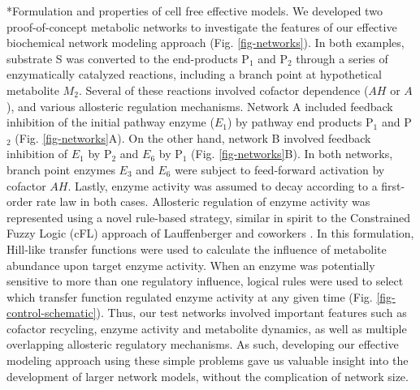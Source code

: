 \documentclass[12pt]{article}
\makeatletter
\renewcommand\subsection{\@startsection
	{subsection}{2}{0mm}
	{-0.05in}
	{-0.5\baselineskip}
	{\normalfont\normalsize\bfseries}}
\makeatother
\begin{document}
\subsection*{Formulation and properties of cell free effective models.}
We developed two proof-of-concept metabolic networks to investigate the features of our effective biochemical network modeling approach (Fig. \ref{fig-networks}).
In both examples, substrate S was converted to the end-products P$_{1}$ and P$_{2}$ through a series of enzymatically catalyzed reactions, 
including a branch point at hypothetical metabolite $M_{2}$. 
Several of these reactions involved cofactor dependence ($AH$ or $A$), and various allosteric regulation mechanisms. 
Network A included feedback inhibition of the initial pathway enzyme ($E_{1}$) by pathway end products P$_{1}$ and P$_{2}$ (Fig. \ref{fig-networks}A).
On the other hand, network B involved feedback inhibition of $E_{1}$ by P$_{2}$ and $E_{6}$ by P$_{1}$ (Fig. \ref{fig-networks}B). 
In both networks, branch point enzymes $E_{3}$ and $E_{6}$ were subject to feed-forward activation by cofactor $AH$.
Lastly, enzyme activity was assumed to decay according to a first-order rate law in both cases. 
Allosteric regulation of enzyme activity was represented using a novel rule-based strategy, similar in spirit to the 
Constrained Fuzzy Logic (cFL) approach of Lauffenberger and coworkers \citep{Morris:2011aa}. 
In this formulation, Hill-like transfer functions were used to calculate the influence of metabolite abundance upon target enzyme activity. 
When an enzyme was potentially sensitive to more than one regulatory influence, logical rules were used to select which transfer function regulated enzyme 
activity at any given time (Fig. \ref{fig-control-schematic}).      
Thus, our test networks involved important features such as cofactor recycling, enzyme activity and metabolite dynamics, 
as well as multiple overlapping allosteric regulatory mechanisms.  
As such, developing our effective modeling approach using these simple problems gave us valuable insight into the development of larger network models, 
without the complication of network size. 
\end{document}
